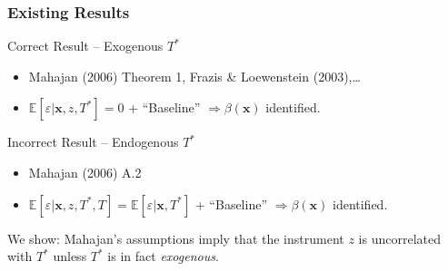 \documentclass[handout]{beamer}
\begin{document}
\begin{frame}
  \frametitle{Existing Results} 

  \begin{block}{Correct Result -- Exogenous $T^*$}
    \begin{itemize}
      \item Mahajan (2006) Theorem 1, Frazis \& Loewenstein (2003),\ldots
      \item $\mathbb{E}[\varepsilon|\mathbf{x},z,T^*] = 0$ + ``Baseline'' $\Rightarrow \beta(\mathbf{x})$ identified.
   \end{itemize}
  \end{block}
  
  \begin{alertblock}{Incorrect Result -- Endogenous $T^*$}
    \begin{itemize}
    \item Mahajan (2006) A.2
    \item $\mathbb{E}[\varepsilon|\mathbf{x}, z, T^*, T] = \mathbb{E}[\varepsilon|\mathbf{x},T^*]$ + ``Baseline'' $\Rightarrow \beta(\mathbf{x})$ identified. 
  \end{itemize}
  \end{alertblock}

  \begin{framed}
    We show: Mahajan's assumptions imply that the instrument $z$ is uncorrelated with $T^*$ unless $T^*$ is in fact \emph{exogenous}.
  \end{framed}



\end{frame}
\end{document}
